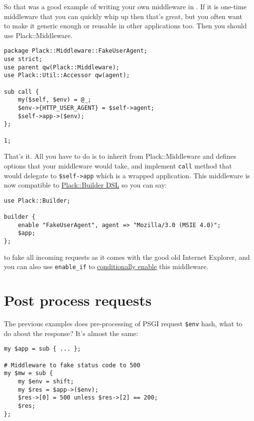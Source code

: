 So that was a good example of writing your own middleware in
. If it is one-time middleware that you can quickly
whip up then that's great, but you often want to make it generic enough
or reusable in other applications too. Then you should use
Plack::Middleware.

\begin{lstlisting}
package Plack::Middleware::FakeUserAgent;
use strict;
use parent qw(Plack::Middleware);
use Plack::Util::Accessor qw(agent);

sub call {
    my($self, $env) = @_;
    $env->{HTTP_USER_AGENT} = $self->agent;
    $self->app->($env);
};

1;
\end{lstlisting}

That's it. All you have to do is to inherit from Plack::Middleware and
defines options that your middleware would take, and implement
\lstinline!call! method that would delegate to \lstinline!$self->app!
which is a wrapped application. This middleware is now compatible to
\href{http://advent.plackperl.org/2009/12/day-11-using-plackbuilder.html}{Plack::Builder
DSL} so you can say:

\begin{lstlisting}
use Plack::Builder;

builder {
    enable "FakeUserAgent", agent => "Mozilla/3.0 (MSIE 4.0)";
    $app;
};
\end{lstlisting}

to fake all incoming requests as it comes with the good old Internet
Explorer, and you can also use \lstinline!enable_if! to
\href{http://advent.plackperl.org/2009/12/day-18-load-middleware-conditionally.html}{conditionally
enable} this middleware.

\section{Post process requests}\label{post-process-requests}

The previous examples does pre-processing of PSGI request
\lstinline!$env! hash, what to do about the response? It's almost the
same:

\begin{lstlisting}
my $app = sub { ... };

# Middleware to fake status code to 500
my $mw = sub {
    my $env = shift;
    my $res = $app->($env);
    $res->[0] = 500 unless $res->[2] == 200;
    $res;
};
\end{lstlisting}

